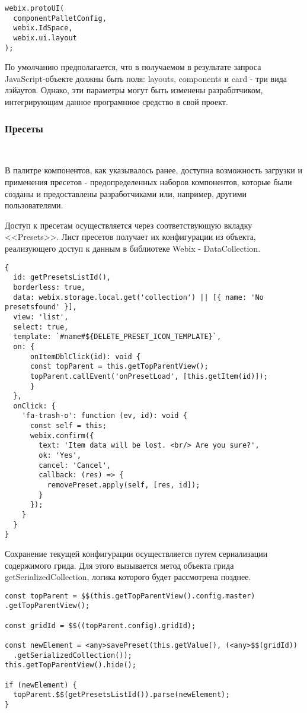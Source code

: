 \begin{lstlisting}
webix.protoUI(
  componentPalletConfig,
  webix.IdSpace,
  webix.ui.layout
);
\end{lstlisting}

По умолчанию предполагается, что в получаемом в результате запроса JavaScript-объекте должны быть поля: layouts, components и card - три вида лэйаутов. Однако, эти параметры могут быть изменены разработчиком, интегрирующим данное програмнное средство в свой проект.

\subsubsection{Пресеты}
\

В палитре компонентов, как указывалось ранее, доступна возможность загрузки и применения пресетов - предопределенных наборов компонентов, которые были созданы и предоставлены разработчиками или, например, другими пользователями.

Доступ к пресетам осуществляется через соответствующую вкладку <<Presets>>. Лист пресетов получает их конфигурации из объекта, реализующего доступ к данным в библиотеке Webix - DataCollection.

\begin{lstlisting}
{
  id: getPresetsListId(),
  borderless: true,
  data: webix.storage.local.get('collection') || [{ name: 'No presetsfound' }],
  view: 'list',
  select: true,
  template: `#name#${DELETE_PRESET_ICON_TEMPLATE}`,
  on: {
      onItemDblClick(id): void {
      const topParent = this.getTopParentView();
      topParent.callEvent('onPresetLoad', [this.getItem(id)]);
      }
  },
  onClick: {
    'fa-trash-o': function (ev, id): void {
      const self = this;
      webix.confirm({
        text: 'Item data will be lost. <br/> Are you sure?',
        ok: 'Yes',
        cancel: 'Cancel',
        callback: (res) => {
          removePreset.apply(self, [res, id]);
        }
      });
    }
  }
}
\end{lstlisting}

Сохранение текущей конфигурации осуществляется путем сериализации содержимого грида. Для этого вызывается метод объекта грида getSerializedCollection, логика которого будет рассмотрена позднее.

\begin{lstlisting}
const topParent = $$(this.getTopParentView().config.master)
.getTopParentView();

const gridId = $$((topParent.config).gridId);

const newElement = <any>savePreset(this.getValue(), (<any>$$(gridId))
  .getSerializedCollection());
this.getTopParentView().hide();

if (newElement) {
  topParent.$$(getPresetsListId()).parse(newElement);
}
\end{lstlisting}

